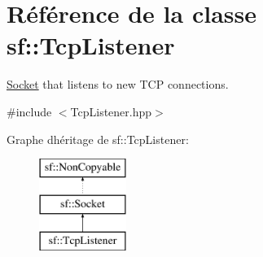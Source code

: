\hypertarget{classsf_1_1TcpListener}{}\section{Référence de la classe sf\+:\+:Tcp\+Listener}
\label{classsf_1_1TcpListener}


\hyperlink{classsf_1_1Socket}{Socket} that listens to new T\+CP connections.  




{\ttfamily \#include $<$Tcp\+Listener.\+hpp$>$}

Graphe d\textquotesingle{}héritage de sf\+:\+:Tcp\+Listener\+:\begin{figure}[H]
\begin{center}
\leavevmode
\includegraphics[height=3.000000cm]{classsf_1_1TcpListener}
\end{center}
\end{figure}
